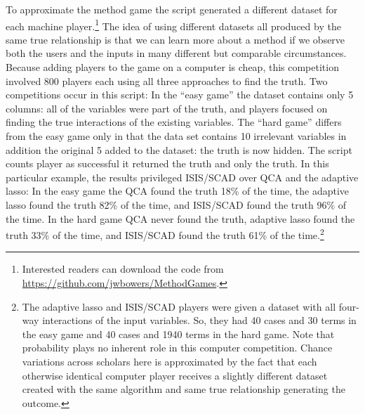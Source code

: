 \documentclass[12pt]{article}
\begin{document}
To approximate the method game the script generated a different dataset for
each machine player.\footnote{Interested readers can download the code from
	\url{https://github.com/jwbowers/MethodGames}.} The idea of using
different datasets all produced by the same true relationship is that we can
learn more about a method if we observe both the users and the inputs in many
different but comparable circumstances.  Because adding players to the game on
a computer is cheap, this competition involved 800 players each using all
three approaches to find the truth. Two competitions occur in this script: In
the ``easy game'' the dataset contains only 5 columns: all of the variables
were part of the truth, and players focused on finding the true interactions
of the existing variables. The ``hard game'' differs from the easy game only
in that the data set contains 10 irrelevant variables in addition the original
5 added to the dataset: the truth is now hidden.  The script counts player as
successful it returned the truth and only the truth.  In this particular
example, the results privileged ISIS/SCAD over QCA and the adaptive lasso: In
the easy game the QCA found the truth 18\% of the time, the adaptive lasso
found the truth 82\% of the time, and ISIS/SCAD found the truth 96\% of the
time. In the hard game QCA never found the truth, adaptive lasso found the
truth 33\% of the time, and ISIS/SCAD found the truth 61\% of the
time.\footnote{The adaptive lasso and ISIS/SCAD players were given a dataset
	with all four-way interactions of the input variables. So, they had 40
	cases and 30 terms in the easy game and 40 cases and 1940 terms in the
	hard game. Note that probability plays no inherent role in this computer
	competition. Chance variations across scholars here is approximated by the
	fact that each otherwise identical computer player receives a slightly
	different dataset created with the same algorithm and same true
	relationship generating the outcome.}
\end{document}
